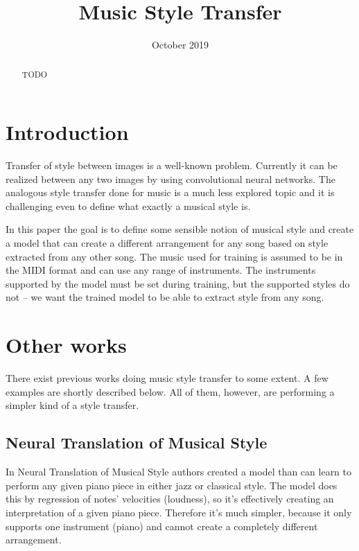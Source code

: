 \documentclass[en]{pracamgr}
\title{Music Style Transfer}
\date{October 2019}
\begin{document}
\maketitle

\begin{abstract}
  TODO
\end{abstract}

\tableofcontents

\chapter{Introduction}

Transfer of style between images is a well-known problem.
Currently it can be realized between any two images by using convolutional neural networks.
The analogous style transfer done for music is a much less explored topic and it is challenging even to define what exactly a musical style is.

In this paper the goal is to define some sensible notion of musical style and create a model that can create a different arrangement for any song based on style extracted from any other song.
The music used for training is assumed to be in the MIDI format and can use any range of instruments.
The instruments supported by the model must be set during training, but the supported styles do not -- we want the trained model to be able to extract style from any song.

\chapter{Other works}

There exist previous works doing music style transfer to some extent.
A few examples are shortly described below.
All of them, however, are performing a simpler kind of a style transfer.

\section{Neural Translation of Musical Style}

In Neural Translation of Musical Style \cite{neural_translation} authors created a model than can learn to perform any given piano piece in either jazz or classical style.
The model does this by regression of notes' velocities (loudness), so it's effectively creating an interpretation of a given piano piece.
Therefore it's much simpler, because it only supports one instrument (piano) and cannot create a completely different arrangement.
\end{document}
